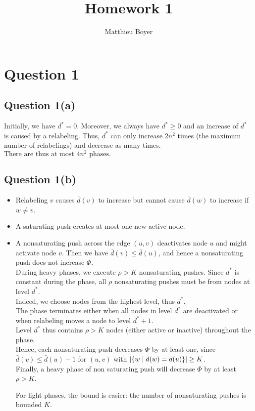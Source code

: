 \documentclass[math]{cours}
\title{Homework 1}
\author{Matthieu Boyer}
\begin{document}
\maketitle
\section{Question 1}
\subsection{Question 1(a)}
Initially, we have $d^{*} = 0$.
Moreover, we always have $d^{*} \geq 0$ and an increase of $d^{*}$ is caused by a relabeling.
Thus, $d^{*}$ can only increase $2n^{2}$ times (the maximum number of relabelings) and decrease as many times.\\
$\boxed{\text{There are thus at most } 4n^{2} \text{ phases.}}$

\subsection{Question 1(b)}
\begin{itemize}
	\item Relabeling $v$ causes $\bar{d}(v)$ to increase but cannot cause $\bar{d}(w)$ to increase if $w \neq v$.\\
	\item A saturating push creates at most one new active node.\\
	\item A nonsaturating push across the edge $(u, v)$ deactivates node $u$ and might activate node $v$.
		Then we have $\bar{d}(v) \leq \bar{d}(u)$, and hence a nonsaturating push does not increase $\Phi$.\\
		\medskip
		During heavy phases, we execute $\rho > K$ nonsaturating pushes.
		Since $d^{*}$ is constant during the phase, all $\rho$ nonsaturating pushes must be from nodes at level $d^{*}$.\\
		Indeed, we choose nodes from the highest level, thus $d^{*}$.\\
		The phase terminates either when all nodes in level $d^{*}$ are deactivated or when relabeling moves a node to level $d^{*} + 1$.\\
		Level $d^{*}$ thus contains $\rho > K$ nodes (either active or inactive) throughout the phase.\\
		Hence, each nonsaturating push decreases $\Phi$ by at least one, since $\bar{d}(v) \leq \bar{d}(u) - 1$ for $(u, v)$ with $\left|\left\{w\mid d(w) = d(u)\right\}\right| \geq K$.\\
		Finally, a heavy phase of non saturating push will decrease $\Phi$ by at least $\rho > K$.\\
		\smallskip

		For light phases, the bound is easier: the number of nonsaturating pushes is bounded $K$.
\end{itemize}
\end{document}

